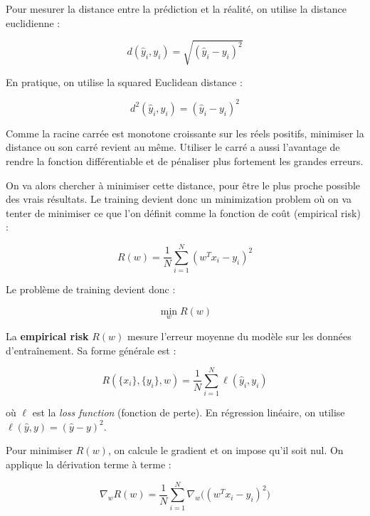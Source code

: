 \documentclass[11pt,a4paper,openany]{book}
\begin{document}
\begin{defnbox}[title=Measure of closeness]
Pour mesurer la distance entre la prédiction et la réalité, on utilise la distance euclidienne :

\[
d(\hat{y}_i, y_i) = \sqrt{(\hat{y}_i - y_i)^2}
\]

En pratique, on utilise la squared Euclidean distance :

\[
d^2(\hat{y}_i, y_i) = (\hat{y}_i - y_i)^2
\]

Comme la racine carrée est monotone croissante sur les réels positifs, minimiser la distance ou son carré revient au même. Utiliser le carré a aussi l'avantage de rendre la fonction différentiable et de pénaliser plus fortement les grandes erreurs.

\vspace{0.4cm}
\end{defnbox}

\vspace{0.4cm}

On va alors chercher à minimiser cette distance, pour être le plus proche possible des vrais résultats.
Le training devient donc un minimization problem où on va tenter de minimiser ce que l'on définit comme la fonction de coût (empirical risk) :

\[
R(w) = \frac{1}{N} \sum_{i=1}^{N} (w^T x_i - y_i)^2
\]

Le problème de training devient donc :

\[
\min_w R(w)
\]

\vspace{0.6cm}

\begin{defnbox}[title=Empirical Risk]
La \textbf{empirical risk} $R(w)$ mesure l'erreur moyenne du modèle sur les données d'entraînement. Sa forme générale est :

\[
R(\{x_i\}, \{y_i\}, w)
=
\frac{1}{N} \sum_{i=1}^{N} \ell(\hat{y}_i, y_i)
\]

où $\ell$ est la \textit{loss function} (fonction de perte). En régression linéaire, on utilise $\ell(\hat{y}, y) = (\hat{y} - y)^2$.
\end{defnbox}

\vspace{1.0cm}

Pour minimiser $R(w)$, on calcule le gradient et on impose qu'il soit nul.
On applique la dérivation terme à terme :

\[
\nabla_w R(w)
=
\frac{1}{N} \sum_{i=1}^{N} \nabla_w \big( (w^T x_i - y_i)^2 \big)
\]
\end{document}
